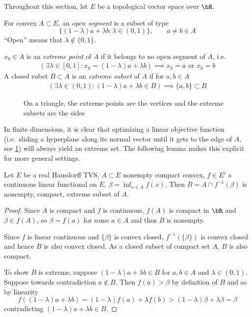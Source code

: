 
Throughout this section, let $E$ be a topological vector space
over $\bR$.

\begin{definition}
  For convex $A \subset E$, an \emph{open segment} is
  a subset of type
  \[
    \{(1-\lambda) a + \lambda b : \lambda \in (0,1) \},\qquad a\neq b \in A
  \]
  ``Open'' means that $\lambda \not\in \{0,1\}$.

  $x_0 \in A$ is an \emph{extreme point} of $A$ if it belongs to no open segment
  of $A$, i.e.
  \begin{align*}
    (\exists \lambda \in [0,1] : x_0 = (1-\lambda) a + \lambda b)
    \implies x_0 = a \text{ or } x_0 = b
  \end{align*}
  A closed subet $B \subset A$ is an \emph{extreme subset} of $A$ if
  for $a,b \in A$
  \begin{align*}
    (\exists \lambda \in (0,1) : (1-\lambda) a + \lambda b \in B)
    \implies \{a,b\} \subset B
  \end{align*}
\end{definition}

\begin{figure}[ht]
    \centering
    \caption{On a triangle, the extreme points are the vertices and the extreme
    subsets are the sides}
    \label{fig:extreme-points}
\end{figure}

In finite dimensions, it is clear that optimizing a linear objective function
(i.e.\ sliding a hyperplane along its normal vector until it gets to the edge
of $A$, see \cref{fig:extreme-points}) will always yield an extreme set. The
following lemma makes this explicit for more general settings.

\begin{lemma}
  \label{lem:cvx-subset-has-extreme-subset}
  Let $E$ be a real Hausdorff TVS, $A \subset E$ nonempty compact convex,
  $f \in E'$ a continuous linear functional on $E$, $\beta = \inf_{x \in A} f(x)$.
  Then $B = A \cap f^{-1}(\beta)$ is nonempty, compact, extreme subset of $A$.
\end{lemma}

\begin{proof}
  Since $A$ is compact and $f$ is continuous, $f(A)$ is compact
  in $\bR$ and $\beta \in f(A)$, so $\beta = f(a)$ for some $a \in A$
  and thus $B$ is nonempty.

  Since $f$ is linear continuous and $\{\beta\}$ is convex closed,
  $f^{-1}(\{\beta\})$ is convex closed and hence
  $B$ is also convex closed. As a closed subset of compact set $A$,
  $B$ is also compact.

  To show $B$ is extreme, suppose $(1-\lambda)a + \lambda b \in B$
  for $a,b \in A$ and $\lambda \in (0,1)$.
  Suppose towards contradiction $a \not\in B$.
  Then $f(a) > \beta$ by definition of $B$ and so by linearity
  \[
    f((1-\lambda) a + \lambda b)
    = (1 - \lambda) f(a) + \lambda f(b) > (1 - \lambda) \beta + \lambda \beta
    = \beta
  \]
  contradicting $(1-\lambda)a + \lambda b \in B$.
\end{proof}

